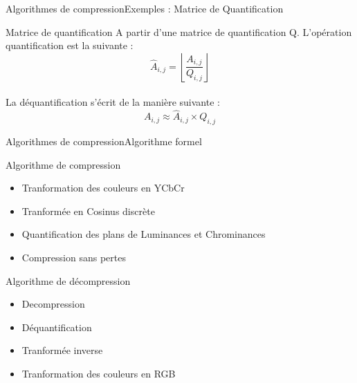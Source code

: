 \begin{frame}{Algorithmes de compression}{Exemples : Matrice de Quantification}
    \begin{block}{Matrice de quantification}
        A partir d'une matrice de quantification Q.
        \newline\newline
         L'opération quantification est la suivante : \\
         \[\widehat{A}_{i,j} = \left\lfloor\frac{A_{i,j}}{Q_{i,j}}\right\rfloor\] \\

         La déquantification s'écrit de la manière suivante : \\
        \[A_{i,j} \approx \widehat{A}_{i,j}\times Q_{i,j} \]
    \end{block}
\end{frame}

%

\begin{frame}{Algorithmes de compression}{Algorithme formel}
    \begin{block}{Algorithme de compression}
        \begin{itemize}
            \item <1-> Tranformation des couleurs en YCbCr
            \item <2-> Tranformée en Cosinus discrète
            \item <3-> Quantification des plans de Luminances et Chrominances
            \item <4-> Compression sans pertes
        \end{itemize}    
    \end{block}
    \begin{block}{Algorithme de décompression}
        \begin{itemize}
            \item Decompression
            \item Déquantification
            \item Tranformée inverse
            \item Tranformation des couleurs en RGB
        \end{itemize}
    \end{block}
\end{frame}

